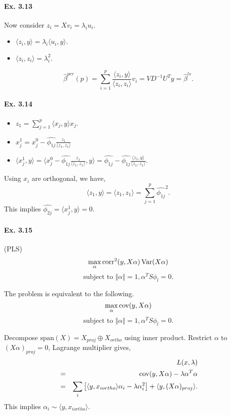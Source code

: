 \paragraph*{Ex. 3.13}
Now consider $z_{i}=Xv_{i}=\lambda_{i}u_i$.
\begin{itemize}
    \item $\langle z_{i}, y\rangle=\lambda_{i}\langle u_{i}, y\rangle$.
    \item $\langle z_{i}, z_{i}\rangle=\lambda_{i}^2$.
\end{itemize}
$$\hat{\beta}^{pcr}(p)=\sum_{i=1}^p\frac{\langle z_{i}, y\rangle}{\langle z_{i}, z_{i}\rangle}v_i=VD^{-1}U^{T}y=\hat{\beta}^{ls}.$$

\paragraph*{Ex. 3.14}
\begin{itemize}
    \item $z_{1} = \sum_{j=1}^{p}\langle x_{j}, y\rangle x_{j}$.
    \item $x_{j}^{1}=x_{j}^0-\widehat{\phi_{1j}}\frac{z_1}{\langle z_1, z_1\rangle}$
    \item $\langle x_{j}^{1}, y \rangle=\langle x_{j}^0-\widehat{\phi_{1j}}\frac{z_1}{\langle z_1, z_1\rangle}, y\rangle=\widehat{\phi_{1j}} - \widehat{\phi_{1j}}\frac{\langle z_1, y\rangle}{\langle z_1, z_1\rangle}. $
\end{itemize}
Using $x_{i}$ are orthogonal, we have,
$$\langle z_1, y\rangle = \langle z_1, z_1\rangle=\sum_{j=1}^p \widehat{\phi_{1j}}^2.$$
This implies $\widehat{\phi_{2j}} = \langle x_{j}^{1}, y \rangle =0.$

\paragraph*{Ex. 3.15}
(PLS)
$$\max_{\alpha}\mbox{corr}^2(y, X\alpha)\operatorname*{\mbox{Var}}(X\alpha)$$
$$\mbox{subject to }\Vert\alpha\Vert=1, \alpha^T S \phi_{l}=0.$$

The problem is equivalent to the following.
$$\max_{\alpha}\operatorname*{\mbox{cov}}(y, X\alpha)$$
$$\mbox{subject to }\Vert\alpha\Vert=1, \alpha^T S \phi_{l}=0.$$

Decompose $\mbox{span}(X)=X_{proj}\oplus X_{ortho}$ using inner product. Restrict $\alpha$ to $(X\alpha)_{proj}=0$, Lagrange multiplier gives,
\begin{eqnarray*}
    && L(x, \lambda) \\
    &=& \operatorname*{\mbox{cov}}(y, X\alpha) - \lambda \alpha^T \alpha\\
    &=& \sum_{i}\left[\langle y, x_{iortho}\rangle \alpha_{i}- \lambda \alpha_i^2\right] + \langle y, (X\alpha)_{proj}\rangle.
\end{eqnarray*}
This implies $\alpha_i\sim \langle y, x_{iortho}\rangle.$

